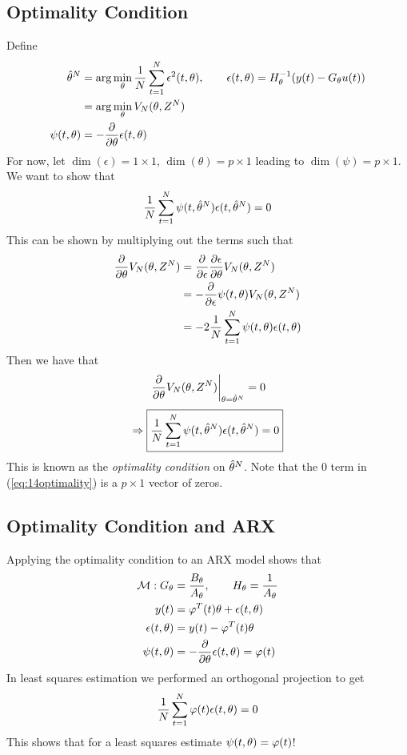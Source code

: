 \subsection{Optimality Condition}
Define
\begin{align*}
\hat{\theta}^N &= \arg\min_\theta\frac{1}{N}\sum_{t=1}^N\epsilon^2(t,\theta), \qquad \epsilon(t,\theta) = H_\theta^{-1}(y(t)-G_\theta u(t)) \\
&= \arg\min_\theta V_N(\theta,Z^N) \\
\psi(t,\theta) &= -\frac{\partial}{\partial\theta}\epsilon(t,\theta)
\end{align*}
For now, let $\dim(\epsilon)=1\times1$, $\dim(\theta)=p\times1$ leading to $\dim(\psi)=p\times1$. We want to show that
\begin{align*}
\frac{1}{N}\sum_{t=1}^N\psi(t,\hat{\theta}^N)\epsilon(t,\hat{\theta}^N) = 0
\end{align*}
This can be shown by multiplying out the terms such that
\begin{align*}
\frac{\partial}{\partial\theta}V_N(\theta,Z^N) &= \frac{\partial}{\partial\epsilon}\frac{\partial\epsilon}{\partial\theta}V_N(\theta,Z^N) \\
&= -\frac{\partial}{\partial\epsilon}\psi(t,\theta)V_N(\theta,Z^N) \\
&= -2\frac{1}{N}\sum_{t=1}^N\psi(t,\theta)\epsilon(t,\theta)
\end{align*}
Then we have that
\begin{align*}
\left.\frac{\partial}{\partial\theta}V_N(\theta,Z^N)\right|_{\theta=\hat{\theta}^N} = 0 \\
\end{align*}
\begin{align}
\label{eq:14optimality}
\Rightarrow \boxed{\frac{1}{N}\sum_{t=1}^N\psi(t,\hat{\theta}^N)\epsilon(t,\hat{\theta}^N) = 0}
\end{align}
This is known as the \textit{optimality condition} on $\hat{\theta}^N$. Note that the $0$ term in (\ref{eq:14optimality}) is a $p\times1$ vector of zeros.

\subsection{Optimality Condition and ARX}
Applying the optimality condition to an ARX model shows that
\begin{align*}
\mathcal{M}: G_\theta&=\frac{B_\theta}{A_\theta}, \qquad H_\theta=\frac{1}{A_\theta} \\
y(t)&= \varphi^T(t)\theta+\epsilon(t,\theta) \\
\epsilon(t,\theta) &= y(t)-\varphi^T(t)\theta \\
\psi(t,\theta) &= -\frac{\partial}{\partial\theta}\epsilon(t,\theta) = \varphi(t)
\end{align*}
In least squares estimation we performed an orthogonal projection to get
\begin{align*}
\frac{1}{N}\sum_{t=1}^N\varphi(t)\epsilon(t,\theta) = 0
\end{align*}
This shows that for a least squares estimate $\psi(t,\theta) = \varphi(t)$!

